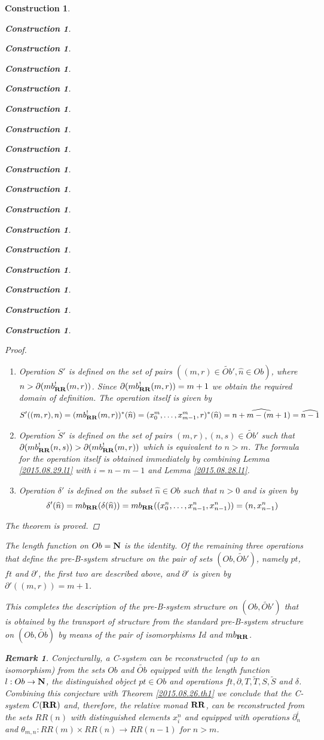 \documentclass[12pt]{amsart}
\newtheorem{remark}[proposition]{Remark}
\newtheorem{construction}[proposition]{Construction}
\newcommand{\llabel}[1]{\label{#1}}
\newcommand{\sr}{\rightarrow}
\newcommand{\nn}{{\bf N\rm}}
\newcommand{\nat}{\nn}
\newcommand{\wt}{\widetilde}
\newcommand{\wh}{\widehat}
\newcommand{\RR}{{\bf RR}}
\begin{document}
\begin{construction}
\begin{construction}
\begin{construction}
\begin{construction}
\begin{construction}
\begin{construction}
\begin{construction}
\begin{construction}
\begin{construction}
\begin{construction}
\begin{construction}
\begin{construction}
\begin{construction}
\begin{construction}
\begin{construction}
\begin{construction}
\begin{construction}
\begin{proof}
\begin{enumerate}
  \ref{2015.08.26.l3a}.
%
\item Operation $S'$ is defined on the set of pairs $((m,r)\in
  \wt{Ob}',\wh{n}\in Ob)$, where $n>\partial(mb_{\RR}^!(m,r))$. Since
  $\partial(mb_{\RR}^!(m,r))=m+1$ we obtain the required domain of
  definition. The operation itself is given by
%
$$S'((m,r),n)=(mb_{\RR}^!(m,r))^*(\wh{n})=(x_0^m,\dots,x_{m-1}^m,r)^*(\wh{n})=\wh{n+m-(m+1)}=\wh{n-1}$$
%
\item Operation $\wt{S}'$ is defined on the set of pairs $(m,r),(n,s)\in
  \wt{Ob}'$ such that $\partial(mb_{\RR}^!(n,s))>\partial(mb_{\RR}^!(m,r))$
  which is equivalent to $n>m$. The formula for the operation itself is
  obtained immediately by combining Lemma \ref{2015.08.29.l1} with $i=n-m-1$
  and Lemma \ref{2015.08.28.l1}.
%
\item Operation $\delta'$ is defined on the subset $\wh{n}\in Ob$ such that
  $n>0$ and is given by
%
$$\delta'(\wh{n})=mb_{\RR}(\delta(\wh{n}))=mb_{\RR}((x_0^n,\dots,x_{n-1}^n,x_{n-1}^n))=(n,x_{n-1}^n)$$
%
\end{enumerate}
%
The theorem is proved. 
\end{proof}
%
The length function on $Ob=\nat$ is the identity. Of the remaining three
operations that define the pre-B-system structure on the pair of sets
$(Ob,\wt{Ob}')$, namely $pt$, $ft$ and $\partial'$, the first two are described above,
and $\partial'$ is given by $\partial'((m,r))=m+1$.

This completes the description of the pre-B-system structure on $(Ob,\wt{Ob}')$
that is obtained by the transport of structure from the standard pre-B-system
structure on $(Ob,\wt{Ob})$ by means of the pair of isomorphisms $Id$ and
$mb_{\RR}$.
%
\begin{remark}\rm
\llabel{2015.08.29.rem2} 
Conjecturally, a C-system can be reconstructed (up to
an isomorphism) from the sets $Ob$ and $\wt{Ob}$ equipped with the length
function $l:Ob\sr\nn$, the distinguished object $pt\in Ob$ and operations $ft,
\partial, T,\wt{T},S,\wt{S}$ and $\delta$. Combining this conjecture with
Theorem \ref{2015.08.26.th1} we conclude that the C-system $C(\RR)$ and,
therefore, the relative monad $\RR$, can be reconstructed from the sets $RR(n)$
with distinguished elements $x^n_i$ and equipped with operations $\partial_n^i$
and $\theta_{m,n}:RR(m)\times RR(n)\sr RR(n-1)$ for $n>m$.


\end{remark}
\end{construction}
\end{construction}
\end{construction}
\end{construction}
\end{construction}
\end{construction}
\end{construction}
\end{construction}
\end{construction}
\end{construction}
\end{construction}
\end{construction}
\end{construction}
\end{construction}
\end{construction}
\end{construction}
\end{construction}
\end{document}

